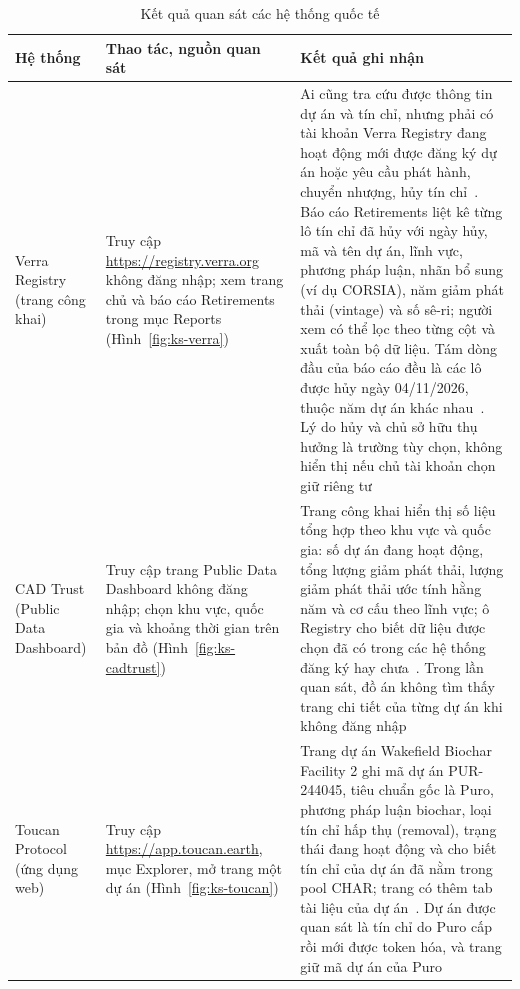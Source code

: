 \begin{table}[htbp]
    \centering
    \caption{Kết quả quan sát các hệ thống quốc tế}
    \label{tab:ks-quansat-qt}
    \small
    \renewcommand{\arraystretch}{1.2}
    \begin{tabularx}{\textwidth}{|>{\raggedright\arraybackslash}p{2.6cm}|>{\raggedright\arraybackslash}p{3.4cm}|X|}
        \hline
        \textbf{Hệ thống} & \textbf{Thao tác, nguồn quan sát} & \textbf{Kết quả ghi nhận} \\
        \hline
        Verra Registry (trang công khai) & Truy cập \url{https://registry.verra.org} không đăng nhập; xem trang chủ và báo cáo Retirements trong mục Reports (Hình~\ref{fig:ks-verra}) & Ai cũng tra cứu được thông tin dự án và tín chỉ, nhưng phải có tài khoản Verra Registry đang hoạt động mới được đăng ký dự án hoặc yêu cầu phát hành, chuyển nhượng, hủy tín chỉ~\cite{verraregistryhome}. Báo cáo Retirements liệt kê từng lô tín chỉ đã hủy với ngày hủy, mã và tên dự án, lĩnh vực, phương pháp luận, nhãn bổ sung (ví dụ CORSIA), năm giảm phát thải (vintage) và số sê-ri; người xem có thể lọc theo từng cột và xuất toàn bộ dữ liệu. Tám dòng đầu của báo cáo đều là các lô được hủy ngày 04/11/2026, thuộc năm dự án khác nhau~\cite{verra2026retirements}. Lý do hủy và chủ sở hữu thụ hưởng là trường tùy chọn, không hiển thị nếu chủ tài khoản chọn giữ riêng tư~\cite{verraregistry} \cite{verra2020registryv2} \\
        \hline
        CAD Trust (Public Data Dashboard) & Truy cập trang Public Data Dashboard không đăng nhập; chọn khu vực, quốc gia và khoảng thời gian trên bản đồ (Hình~\ref{fig:ks-cadtrust}) & Trang công khai hiển thị số liệu tổng hợp theo khu vực và quốc gia: số dự án đang hoạt động, tổng lượng giảm phát thải, lượng giảm phát thải ước tính hằng năm và cơ cấu theo lĩnh vực; ô Registry cho biết dữ liệu được chọn đã có trong các hệ thống đăng ký hay chưa~\cite{cadtrust2026dashboard}. Trong lần quan sát, đồ án không tìm thấy trang chi tiết của từng dự án khi không đăng nhập \\
        \hline
        Toucan Protocol (ứng dụng web) & Truy cập \url{https://app.toucan.earth}, mục Explorer, mở trang một dự án (Hình~\ref{fig:ks-toucan}) & Trang dự án Wakefield Biochar Facility 2 ghi mã dự án PUR-244045, tiêu chuẩn gốc là Puro, phương pháp luận biochar, loại tín chỉ hấp thụ (removal), trạng thái đang hoạt động và cho biết tín chỉ của dự án đã nằm trong pool CHAR; trang có thêm tab tài liệu của dự án~\cite{toucan2026wakefield}. Dự án được quan sát là tín chỉ do Puro cấp rồi mới được token hóa, và trang giữ mã dự án của Puro \\
        \hline
    \end{tabularx}
\end{table}

